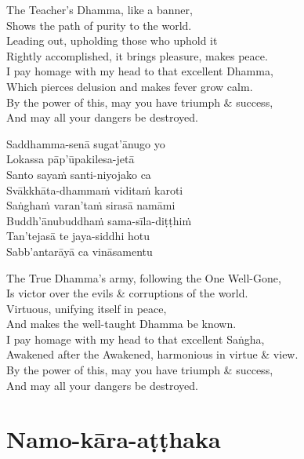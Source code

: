 \begin{english-verses}
  The Teacher's Dhamma, like a banner,\\
  Shows the path of purity to the world.\\
  Leading out, upholding those who uphold it\\
  Rightly accomplished, it brings pleasure, makes peace.\\
  I pay homage with my head to that excellent Dhamma,\\
  Which pierces delusion and makes fever grow calm.\\
  By the power of this, may you have triumph \& success,\\
  And may all your dangers be destroyed.
\end{english-verses}

\begin{pali-hang-continued}
  Saddhamma-senā sugat'ānugo yo\\
  Lokassa pāp'ūpakilesa-jetā\\
  Santo sayaṁ santi-niyojako ca\\
  Svākkhāta-dhammaṁ viditaṁ karoti\\
  Saṅghaṁ varan'taṁ sirasā namāmi\\
  Buddh'ānubuddhaṁ sama-sīla-diṭṭhiṁ\\
  Tan'tejasā te jaya-siddhi hotu\\
  Sabb'antarāyā ca vināsamentu
\end{pali-hang-continued}

\begin{english-verses}
  The True Dhamma's army, following the One Well-Gone,\\
  Is victor over the evils \& corruptions of the world.\\
  Virtuous, unifying itself in peace,\\
  And makes the well-taught Dhamma be known.\\
  I pay homage with my head to that excellent Saṅgha,\\
  Awakened after the Awakened, harmonious in virtue \& view.\\
  By the power of this, may you have triumph \& success,\\
  And may all your dangers be destroyed.
\end{english-verses}

\suttaRef{[Thai]}

\section{Namo-kāra-aṭṭhaka}
\label{namo-kara-atthaka}

